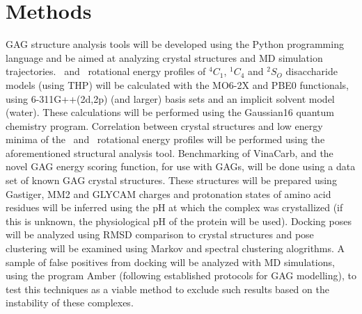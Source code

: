 \documentclass[journal=jctcce,manuscript=article]{achemso}
\begin{document}
{\section{Methods}

\ac{GAG} structure analysis tools will be developed using the Python programming language and be aimed at analyzing crystal structures and \ac{MD} simulation trajectories.
\textphi~and \textpsi~rotational energy profiles of $^{4}C_{1}$, $^{1}C_{4}$ and $^{2}S_{O}$ disaccharide models (using \ac{THP}) will be calculated with the MO6-2X and PBE0 functionals, using 6-311G++(2d,2p) (and larger) basis sets and an implicit solvent model (water). These calculations will be performed using the Gaussian16 quantum chemistry program. Correlation between crystal structures and low energy minima of the \textphi~and \textpsi~rotational energy profiles will be performed using the aforementioned structural analysis tool. Benchmarking of VinaCarb, and the novel \ac{GAG} energy scoring function, for use with \acp{GAG}, will be done using a data set of known GAG crystal structures. These structures will be prepared using Gastiger, MM2 and GLYCAM charges and protonation states of amino acid residues will be inferred using the pH at which the complex was crystallized (if this is unknown, the physiological pH of the protein will be used). Docking poses will be analyzed using \ac{RMSD} comparison to crystal structures and pose clustering will be examined using Markov and spectral clustering alogrithms. A sample of false positives from docking will be analyzed with \ac{MD} simulations, using the program Amber (following established protocols for \ac{GAG} modelling), to test this techniques as a viable method to exclude such results based on the instability of these complexes.


}
\newpage
{

}

\end{document}

